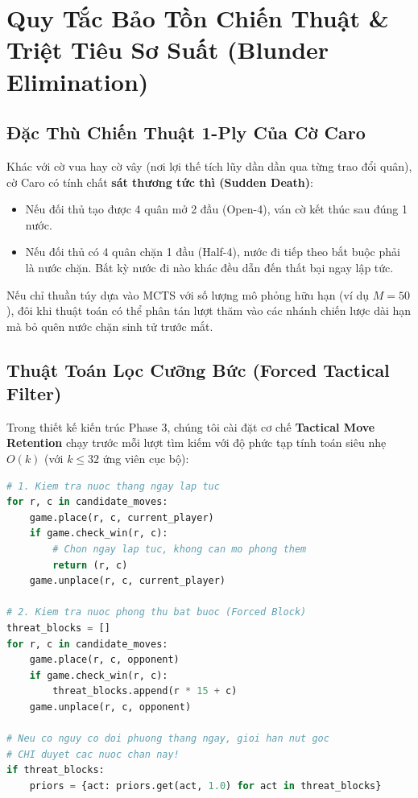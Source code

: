 \documentclass[12pt,a4paper,oneside]{report}
\begin{document}
\chapter{Quy Tắc Bảo Tồn Chiến Thuật \& Triệt Tiêu Sơ Suất (Blunder Elimination)}

\section{Đặc Thù Chiến Thuật 1-Ply Của Cờ Caro}

Khác với cờ vua hay cờ vây (nơi lợi thế tích lũy dần dần qua từng trao đổi quân), cờ Caro có tính chất \textbf{sát thương tức thì (Sudden Death)}:
\begin{itemize}
    \item Nếu đối thủ tạo được 4 quân mở 2 đầu (Open-4), ván cờ kết thúc sau đúng 1 nước.
    \item Nếu đối thủ có 4 quân chặn 1 đầu (Half-4), nước đi tiếp theo bắt buộc phải là nước chặn. Bất kỳ nước đi nào khác đều dẫn đến thất bại ngay lập tức.
\end{itemize}

Nếu chỉ thuần túy dựa vào MCTS với số lượng mô phỏng hữu hạn (ví dụ $M = 50$), đôi khi thuật toán có thể phân tán lượt thăm vào các nhánh chiến lược dài hạn mà bỏ quên nước chặn sinh tử trước mắt.

\section{Thuật Toán Lọc Cưỡng Bức (Forced Tactical Filter)}

Trong thiết kế kiến trúc Phase 3, chúng tôi cài đặt cơ chế \textbf{Tactical Move Retention} chạy trước mỗi lượt tìm kiếm với độ phức tạp tính toán siêu nhẹ $O(k)$ (với $k \le 32$ ứng viên cục bộ):

\begin{lstlisting}[language=Python, caption={Cơ chế triệt tiêu sơ suất trong MCTS}]
# 1. Kiem tra nuoc thang ngay lap tuc
for r, c in candidate_moves:
    game.place(r, c, current_player)
    if game.check_win(r, c):
        # Chon ngay lap tuc, khong can mo phong them
        return (r, c)
    game.unplace(r, c, current_player)

# 2. Kiem tra nuoc phong thu bat buoc (Forced Block)
threat_blocks = []
for r, c in candidate_moves:
    game.place(r, c, opponent)
    if game.check_win(r, c):
        threat_blocks.append(r * 15 + c)
    game.unplace(r, c, opponent)

# Neu co nguy co doi phuong thang ngay, gioi han nut goc
# CHI duyet cac nuoc chan nay!
if threat_blocks:
    priors = {act: priors.get(act, 1.0) for act in threat_blocks}
\end{lstlisting}
\end{document}
